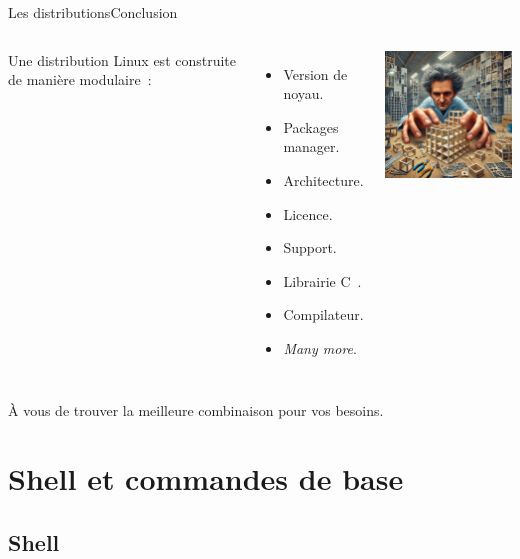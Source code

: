 \documentclass{beamer}
\begin{document}
    \begin{frame}{Les distributions}{Conclusion}
        \begin{columns}
            Une distribution Linux est construite de manière modulaire~:
            \begin{itemize}
                \item Version de noyau.
                \item Packages manager.
                \item Architecture.
                \item Licence.
                \item Support.
                \item Librairie C~.
                \item Compilateur.
                \item \textit{Many more}.
            \end{itemize}
            \centering
            \includegraphics[width=5.5cm]{image/craftsman-focused}
        \end{columns}
        \bigbreak
        À vous de trouver la meilleure combinaison pour vos besoins.
    \end{frame}


    \section{Shell et commandes de base}\label{sec:shell-and-command}

    \subsection{Shell}\label{subsec:shell}
\end{document}
